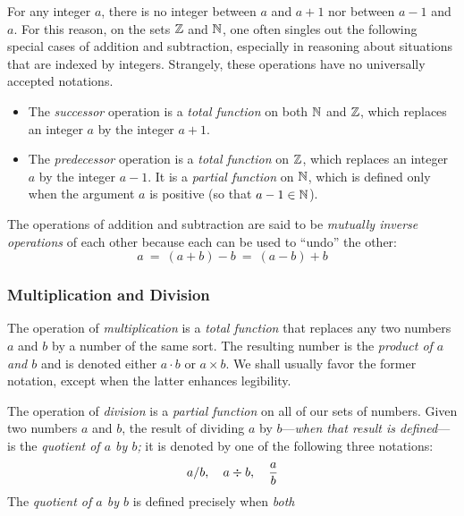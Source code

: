 For any integer $a$, there is no integer between $a$ and $a+1$ nor
between $a-1$ and $a$.  For this reason, on the sets $\mathbb{Z}$ and $\mathbb{N}$,
one often singles out the following special cases of addition and
subtraction, especially in reasoning about situations that are indexed
by integers.  Strangely, these operations have no universally accepted
notations.
\begin{itemize}
\item
The {\it successor} operation is
a {\em total function} on both $\mathbb{N}$ and $\mathbb{Z}$, which replaces an
integer $a$ by the integer $a+1$.
\item
The {\it predecessor} operation
is a {\em total function} on $\mathbb{Z}$, which replaces an integer $a$ by
the integer $a-1$.  It is a {\em partial function} on $\mathbb{N}$, which is
defined only when the argument $a$ is positive (so that $a-1 \in \mathbb{N}$).
\end{itemize}

The operations of addition and subtraction are said to be {\em
  mutually inverse operations}  of each other because each can be used to ``undo''
the other:
\[
a \ = \ (a+b) -b \ = \ (a-b) +b
\]

\subsubsection{Multiplication and Division}

The operation of {\it multiplication}
is a {\em total function} that replaces any two numbers $a$ and $b$ by
a number of the same sort.  The resulting number is the {\em product
  of $a$ and $b$} and is
denoted either $a \cdot b$ 
or $a \times b$.
We shall usually favor the former notation, except when the latter
enhances legibility.

The operation of {\it division} is a {\em
  partial function} on all of our sets of numbers.  Given two numbers
$a$ and $b$, the result of dividing $a$ by $b$---{\em when that result
  is defined}---is the {\it quotient of $a$ by $b$;}
it is denoted by one of the following three notations:
\[  a/b, \ \ \ a \div b, \ \ \ {a \over b}  \]
The {\it quotient of $a$ by $b$} is defined precisely when {\em both}

